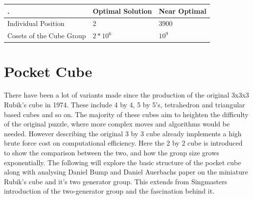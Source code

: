 \documentclass{article}
\newcounter{lem}[section]\setcounter{lem}{0}
\begin{document}
\begin{center}
\label{:thistletab}
    \begin{tabular}{ |p{5cm}| p{4cm}| p{4cm}|}
    \hline
    . & Optimal Solution & Near Optimal \\ \hline
    Individual Position & 2 & 3900\\ \hline
	Cosets of the Cube Group & $2*10^6$  & $10^9$\\ \hline
    \end{tabular}
\end{center}

\newpage
\section{Pocket Cube}

\begin{figure}[h]
\centering
  \TwoCubeSolved%
\end{figure}

There have been a lot of variants made since the production of the original 3x3x3 Rubik's cube in 1974. These include 4 by 4, 5 by 5's, tetrahedron and triangular based cubes and so on. The majority of these cubes aim to heighten the difficulty of the original puzzle, where more complex moves and algorithms would be needed. However describing the original 3 by 3 cube already implements a high brute force cost on computational efficiency. Here the 2 by 2 cube is introduced to show the comparison between the two, and how the group size grows exponentially. The following will explore the basic structure of the pocket cube along with analysing Daniel Bump and Daniel Auerbachs paper on the miniature Rubik's cube and it's two generator group. This extends from Singmasters introduction of the two-generator group and the fascination behind it.
\end{document}
